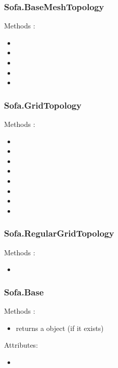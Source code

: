 \subsubsection{Sofa.BaseMeshTopology}
Methods :
\begin{itemize}
\item {} 
\item {}
\item {}
\item {}
\item {}
\end{itemize}

\subsubsection{Sofa.GridTopology}
Methods :
\begin{itemize}
\item {} 
\item {} 
\item {}
\item {}
\item {}
\item {}
\item {}
\item {}
\end{itemize}

\subsubsection{Sofa.RegularGridTopology}
Methods :
\begin{itemize}
\item {} 
\end{itemize}

\subsubsection{Sofa.Base}
Methods :
\begin{itemize}
\item {} returns a  object (if it exists)
\end{itemize}
Attributes:
\begin{itemize}
\item {} 
\end{itemize}

